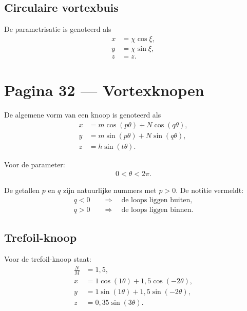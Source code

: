 \documentclass[11pt]{article}
\begin{document}
\subsection*{Circulaire vortexbuis}

De parametrisatie is genoteerd als
\begin{align*}
x &= \chi\cos\xi,\\
y &= \chi\sin\xi,\\
z &= z.
\end{align*}

\newpage

\section*{Pagina 32 --- Vortexknopen}

De algemene vorm van een knoop is genoteerd als
\begin{align*}
x
&=
m\cos\left(p\theta\right)
+N\cos\left(q\theta\right),
\\
y
&=
m\sin\left(p\theta\right)
+N\sin\left(q\theta\right),
\\
z
&=
h\sin\left(t\theta\right).
\end{align*}

Voor de parameter:
\begin{align*}
0<\theta<2\pi.
\end{align*}

De getallen $p$ en $q$ zijn natuurlijke nummers met $p>0$. De notitie vermeldt:
\begin{align*}
q<0 &\quad\Rightarrow\quad \text{de loops liggen buiten},\\
q>0 &\quad\Rightarrow\quad \text{de loops liggen binnen}.
\end{align*}

\subsection*{Trefoil-knoop}

Voor de trefoil-knoop staat:
\begin{align*}
\frac{N}{M}
  &=
  1{,}5,
\\
x
&=
1\cos\left(1\theta\right)
+1{,}5\cos\left(-2\theta\right),
\\
y
&=
1\sin\left(1\theta\right)
+1{,}5\sin\left(-2\theta\right),
\\
z
&=
0{,}35\sin\left(3\theta\right).
\end{align*}

\newpage
\end{document}
